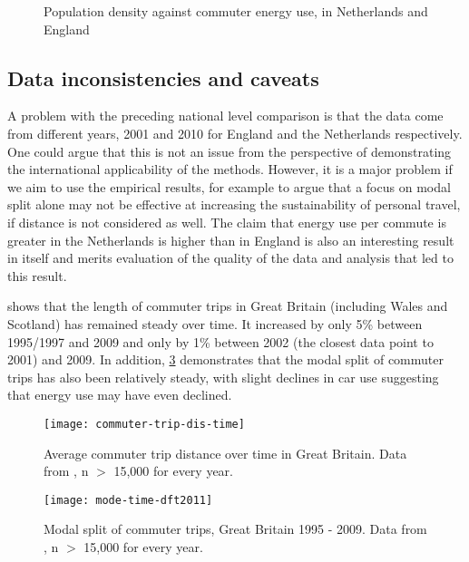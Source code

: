 \begin{figure}
 \caption[Population density against commuter energy use]
 {Population density against commuter energy use, in Netherlands and England}
 \label{fepdensnl}
\end{figure}

\subsection{Data inconsistencies and caveats}
A problem with the preceding national level comparison is that the
data come from different years, 2001 and 2010 for England and the Netherlands
respectively. One could argue that this is not an issue
from the perspective of demonstrating the international applicability of the
methods. However, it is a major problem if we aim to use the empirical results,
for example to argue that a focus on modal split alone may not be  effective at
increasing the sustainability of personal travel, if distance is not considered
as well. %
The claim that energy use per commute is greater in the Netherlands is
higher than in England is also an interesting result in itself and merits
evaluation of the quality of the data and analysis that led to this result.

 shows that the length of commuter trips in Great
Britain (including Wales and Scotland) has remained steady over
time. It increased by only 5\% between 1995/1997 and 2009 and only by
1\% between 2002 (the closest data point to 2001) and 2009. In addition,
\cref{fmode-time-dft2011} demonstrates that the modal split of commuter trips
has also been relatively steady, with slight declines in car use suggesting that
energy use may have even declined. 

\begin{figure}
 \texttt{[image: commuter-trip-dis-time]}
 \caption[Average commuter trip distance over time in Great Britain]
 {Average commuter trip distance over time in Great Britain. Data from
 \citet[table 9]{DfT2011-commuting}, n $>$ 15,000 for every year.} \label{fcommuterdistime}
\end{figure}

\begin{figure}
 \texttt{[image: mode-time-dft2011]}
 \caption[Modal split of commuter trips, Great Britain 1995 - 2009]
 {Modal split of commuter trips, Great Britain 1995 - 2009. Data from
 \citet[table 9]{DfT2011-commuting}, n $>$ 15,000 for every year.} \label{fmode-time-dft2011}
\end{figure}

